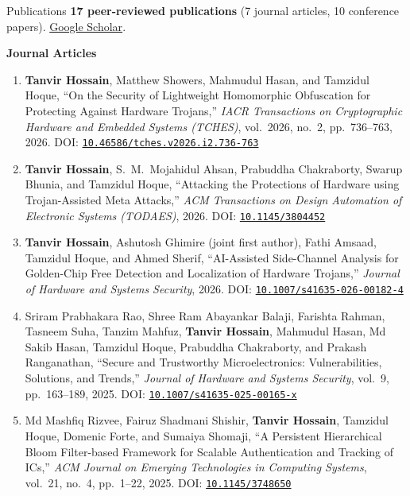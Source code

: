 \begin{rSection}{Publications}
\newcommand{\doi}[1]{DOI: \href{https://doi.org/#1}{\nolinkurl{#1}}}
\vspace{0.05cm}
{\bf 17 peer-reviewed publications} (7 journal articles, 10 conference papers). \href{https://scholar.google.com/citations?user=lPEOU2wAAAAJ&hl=en}{Google Scholar}.

\vspace{0.05cm}
\textbf{Journal Articles}
\vspace{-0.25cm}

\begin{enumerate}[itemsep=-0.1em, leftmargin=1.5em]
    \item \textbf{Tanvir Hossain}, Matthew Showers, Mahmudul Hasan, and Tamzidul Hoque, ``On the Security of Lightweight Homomorphic Obfuscation for Protecting Against Hardware Trojans,'' \emph{IACR Transactions on Cryptographic Hardware and Embedded Systems (TCHES)}, vol.\ 2026, no.\ 2, pp.\ 736--763, 2026. \doi{10.46586/tches.v2026.i2.736-763}

    \item \textbf{Tanvir Hossain}, S.\ M.\ Mojahidul Ahsan, Prabuddha Chakraborty, Swarup Bhunia, and Tamzidul Hoque, ``Attacking the Protections of Hardware using Trojan-Assisted Meta Attacks,'' \emph{ACM Transactions on Design Automation of Electronic Systems (TODAES)}, 2026. \doi{10.1145/3804452}

    \item \textbf{Tanvir Hossain}, Ashutosh Ghimire (joint first author), Fathi Amsaad, Tamzidul Hoque, and Ahmed Sherif, ``AI-Assisted Side-Channel Analysis for Golden-Chip Free Detection and Localization of Hardware Trojans,'' \emph{Journal of Hardware and Systems Security}, 2026. \doi{10.1007/s41635-026-00182-4}

    \item Sriram Prabhakara Rao, Shree Ram Abayankar Balaji, Farishta Rahman, Tasneem Suha, Tanzim Mahfuz, \textbf{Tanvir Hossain}, Mahmudul Hasan, Md Sakib Hasan, Tamzidul Hoque, Prabuddha Chakraborty, and Prakash Ranganathan, ``Secure and Trustworthy Microelectronics: Vulnerabilities, Solutions, and Trends,'' \emph{Journal of Hardware and Systems Security}, vol.\ 9, pp.\ 163--189, 2025. \doi{10.1007/s41635-025-00165-x}

    \item Md Mashfiq Rizvee, Fairuz Shadmani Shishir, \textbf{Tanvir Hossain}, Tamzidul Hoque, Domenic Forte, and Sumaiya Shomaji, ``A Persistent Hierarchical Bloom Filter-based Framework for Scalable Authentication and Tracking of ICs,'' \emph{ACM Journal on Emerging Technologies in Computing Systems}, vol.\ 21, no.\ 4, pp.\ 1--22, 2025. \doi{10.1145/3748650}


\end{enumerate}
\end{rSection}

